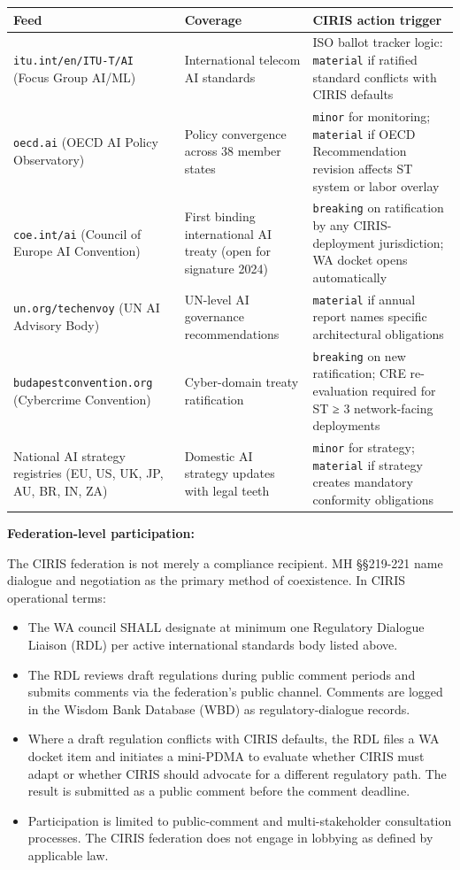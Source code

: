 \documentclass[11pt]{article}
\begin{document}
{\footnotesize
\begin{longtable}{|p{5.33cm}|p{5.33cm}|p{5.33cm}|}\hline
\textbf{Feed} & \textbf{Coverage} & \textbf{CIRIS action trigger} \\ \hline\endhead
\texttt{itu.int/en/ITU-T/AI} (Focus Group AI/ML) & International telecom AI standards & ISO ballot tracker logic: \texttt{material} if ratified standard conflicts with CIRIS defaults \\ \hline
\texttt{oecd.ai} (OECD AI Policy Observatory) & Policy convergence across 38 member states & \texttt{minor} for monitoring; \texttt{material} if OECD Recommendation revision affects ST system or labor overlay \\ \hline
\texttt{coe.int/ai} (Council of Europe AI Convention) & First binding international AI treaty (open for signature 2024) & \texttt{breaking} on ratification by any CIRIS-deployment jurisdiction; WA docket opens automatically \\ \hline
\texttt{un.org/techenvoy} (UN AI Advisory Body) & UN-level AI governance recommendations & \texttt{material} if annual report names specific architectural obligations \\ \hline
\texttt{budapestconvention.org} (Cybercrime Convention) & Cyber-domain treaty ratification & \texttt{breaking} on new ratification; CRE re-evaluation required for ST ≥ 3 network-facing deployments \\ \hline
National AI strategy registries (EU, US, UK, JP, AU, BR, IN, ZA) & Domestic AI strategy updates with legal teeth & \texttt{minor} for strategy; \texttt{material} if strategy creates mandatory conformity obligations \\ \hline
\end{longtable}}


\textbf{Federation-level participation:}


The CIRIS federation is not merely a compliance recipient. MH §§219-221 name dialogue and negotiation as the primary method of coexistence. In CIRIS operational terms:


\begin{itemize}\setlength\itemsep{0pt}
\item The WA council SHALL designate at minimum one Regulatory Dialogue Liaison (RDL) per active international standards body listed above.
\item The RDL reviews draft regulations during public comment periods and submits comments via the federation's public channel. Comments are logged in the Wisdom Bank Database (WBD) as regulatory-dialogue records.
\item Where a draft regulation conflicts with CIRIS defaults, the RDL files a WA docket item and initiates a mini-PDMA to evaluate whether CIRIS must adapt or whether CIRIS should advocate for a different regulatory path. The result is submitted as a public comment before the comment deadline.
\item Participation is limited to public-comment and multi-stakeholder consultation processes. The CIRIS federation does not engage in lobbying as defined by applicable law.
\end{itemize}
\end{document}
